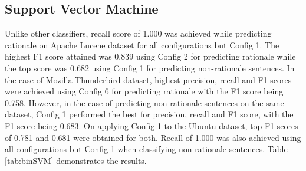 \documentclass[a4paper,12pt,twoside]{report}
\begin{document}
\subsection{Support Vector Machine}
Unlike other classifiers, recall score of 1.000 was achieved while predicting rationale on Apache Lucene dataset for all configurations but Config 1. The highest F1 score attained was 0.839 using Config 2 for predicting rationale while the top score was 0.682 using Config 1 for predicting non-rationale sentences. In the case of Mozilla Thunderbird dataset, highest precision, recall and F1 scores were achieved using Config 6 for predicting rationale with the F1 score being 0.758. However, in the case of predicting non-rationale sentences on the same dataset, Config 1 performed the best for precision, recall and F1 score, with the F1 score being 0.683. On applying Config 1 to the Ubuntu dataset, top F1 scores of 0.781 and 0.681 were obtained for both. Recall of 1.000 was also achieved using all configurations but Config 1 when classifying non-rationale sentences. Table \ref{tab:binSVM} demonstrates the results. 
\end{document}
